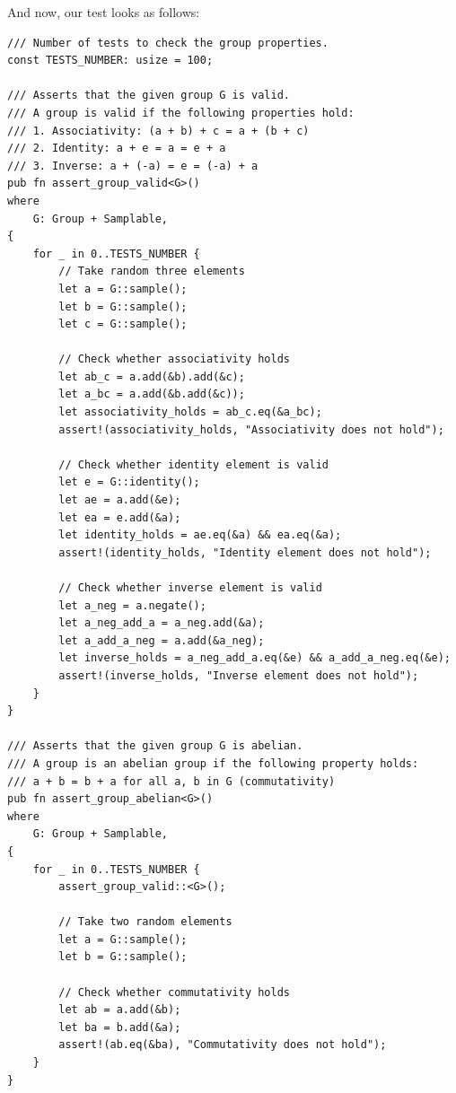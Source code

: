 \documentclass[../../book.tex]{subfiles}
\begin{document}
And now, our test looks as follows:
\begin{verbatim}
/// Number of tests to check the group properties.
const TESTS_NUMBER: usize = 100;

/// Asserts that the given group G is valid.
/// A group is valid if the following properties hold:
/// 1. Associativity: (a + b) + c = a + (b + c)
/// 2. Identity: a + e = a = e + a
/// 3. Inverse: a + (-a) = e = (-a) + a
pub fn assert_group_valid<G>()
where
    G: Group + Samplable,
{
    for _ in 0..TESTS_NUMBER {
        // Take random three elements
        let a = G::sample();
        let b = G::sample();
        let c = G::sample();

        // Check whether associativity holds
        let ab_c = a.add(&b).add(&c);
        let a_bc = a.add(&b.add(&c));
        let associativity_holds = ab_c.eq(&a_bc);
        assert!(associativity_holds, "Associativity does not hold");

        // Check whether identity element is valid
        let e = G::identity();
        let ae = a.add(&e);
        let ea = e.add(&a);
        let identity_holds = ae.eq(&a) && ea.eq(&a);
        assert!(identity_holds, "Identity element does not hold");

        // Check whether inverse element is valid
        let a_neg = a.negate();
        let a_neg_add_a = a_neg.add(&a);
        let a_add_a_neg = a.add(&a_neg);
        let inverse_holds = a_neg_add_a.eq(&e) && a_add_a_neg.eq(&e);
        assert!(inverse_holds, "Inverse element does not hold");
    }
}

/// Asserts that the given group G is abelian.
/// A group is an abelian group if the following property holds:
/// a + b = b + a for all a, b in G (commutativity)
pub fn assert_group_abelian<G>()
where
    G: Group + Samplable,
{
    for _ in 0..TESTS_NUMBER {
        assert_group_valid::<G>();

        // Take two random elements
        let a = G::sample();
        let b = G::sample();

        // Check whether commutativity holds
        let ab = a.add(&b);
        let ba = b.add(&a);
        assert!(ab.eq(&ba), "Commutativity does not hold");
    }
}    
\end{verbatim}
\end{document}
